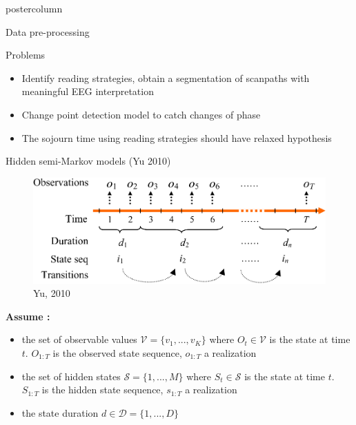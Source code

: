 \documentclass[final,hyperref={pdfpagelabels=false}]{beamer}
\begin{document}
\begin{frame}
\begin{columns}
\begin{column}{.50\textwidth}
\begin{beamercolorbox}[center,wd=\textwidth]{postercolumn}
\begin{minipage}[T]{.98\textwidth}
{\begin{block}{Data pre-processing}
            \end{block}
            \vfill
            \begin{block}{Problems}
                \begin{itemize}
                    \item[\bullet] Identify reading strategies, obtain a segmentation of scanpaths with meaningful EEG interpretation
                    \item[\bullet] Change point detection model to catch changes of phase
                    \item[\bullet] The sojourn time using reading strategies should have relaxed hypothesis
                \end{itemize}
            \end{block}
            \vfill
            \begin{block}{Hidden semi-Markov models (Yu 2010)}
                \begin{figure}[H]
                    \includegraphics[width=.60\linewidth]{hsmm_representation.png}
                    \caption{Yu, 2010}
                \end{figure}
                \vskip-2cm
                \textbf{Assume :}
                \begin{itemize}
                    \item[\bullet] the set of observable values $\mathcal{V} = \{ v_1,..., v_K\}$
                    where $O_t \in \mathcal{V}$ is the state at time $t$. $O_{1:T}$ is the observed state sequence,
                    $o_{1:T}$ a realization
                    \item[\bullet] the set of hidden states $\mathcal{S}=\{1,...,M\}$
                    where $S_t \in \mathcal{S}$ is the state at time $t$. $S_{1:T}$ is the hidden state sequence,
                    $s_{1:T}$ a realization
                    \item[\bullet] the state duration $d \in \mathcal{D}=\{1,...,D\}$
                \end{itemize}


\end{block}}
\end{minipage}
\end{beamercolorbox}
\end{column}
\end{columns}
\end{frame}
\end{document}

